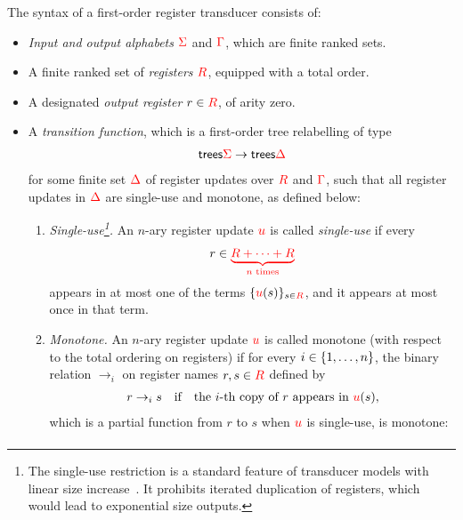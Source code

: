 \begin{definition}\label{def:stt}
The syntax of a first-order register transducer consists of: 
\begin{itemize}
    \item \emph{Input and output alphabets} ${\color{red}{\Sigma}}$ and ${\color{red}{\Gamma}}$, which are finite ranked sets.
    \item A finite ranked set of \emph{registers} ${{\color{red}{R}}}$, equipped with a total order.
    \item A designated \emph{output register} $r \in {{\color{red}{R}}}$, of arity zero.
    \item A \emph{transition function}, which is a  first-order tree relabelling of type
    \begin{align*}
      \mathsf {trees}{{\color{red}{\Sigma}}} \to \mathsf {trees}{{\color{red}{\Delta}}}
    \end{align*}for some finite set ${\color{red}{\Delta}}$ of  register updates over ${{\color{red}{R}}}$ and ${\color{red}{\Gamma}}$, 
    such that all register updates in  ${\color{red}{\Delta}}$ are single-use and monotone, as defined below:
    \begin{enumerate}
        \item \emph{Single-use\footnote{The  single-use restriction  is a standard feature of transducer models with linear size increase~\cite{bloem_comparison_2000, alurStreamingStringTransducers2011,alur2017streaming}.   It prohibits iterated duplication of registers, which would lead to exponential size outputs.    
        }.}  An $n$-ary register update ${\color{red}{u}}$ is  called  \emph{single-use} if   every
        \begin{align*}
            r \in {\color{red}{\underbrace{{{\color{red}{R}}}+ \cdots + {{\color{red}{R}}}}_{\text{$n$ times}}}}
        \end{align*}
        appears in at most one of the terms $\{{\color{red}{u}}(s)\}_{s \in {{\color{red}{R}}}}$, and it appears at most once in that term. 
        \item \emph{Monotone.} An $n$-ary  register update ${\color{red}{u}}$ is called monotone (with respect to the total ordering on registers) if for every $i \in \{1,\ldots,n\}$, the binary relation $\to_i$ on register names $r,s \in {{\color{red}{R}}}$  defined by
        \begin{align*} 
            r \to_i s \quad \text{if} \quad  \text{the $i$-th copy of $r$ appears in ${\color{red}{u}}(s)$},
        \end{align*}
        which is a partial function from $r$ to $s$ when ${\color{red}{u}}$ is single-use, is monotone:
        \begin{align*}

\end{align*}
\end{enumerate}
\end{itemize}
\end{definition}
